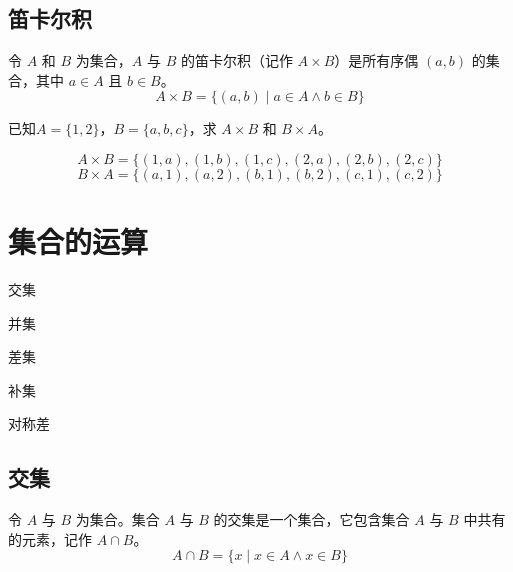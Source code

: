 \documentclass[lang=cn, chinesefont=founder, math=cm, color=cyan, citestyle=gb7714-2015, bibstyle=gb7714-2015]{elegantbook}
\begin{document}
\subsection{笛卡尔积}
\begin{definition}[笛卡尔积]\label{def:笛卡尔积}
    令 $A$ 和 $B$ 为集合，$A$ 与 $B$ 的笛卡尔积（记作 $A \times B$）是所有序偶 $(a,b)$ 的集合，其中 $a \in A$ 且 $b \in B$。
    \begin{equation*}
        A \times B = \{(a,b) \mid a \in A \land b \in B \}
    \end{equation*}
\end{definition}

\begin{collections}
    \begin{example}
        已知$A = \{1, 2\}$，$B = \{a, b, c\}$，求 $A \times B$ 和 $B \times A$。
    \end{example}
    \begin{solution}
        $$A \times B = \{(1, a), (1, b), (1, c), (2, a), (2, b), (2, c)\}$$
        $$B \times A = \{(a, 1), (a, 2), (b, 1), (b, 2), (c, 1), (c, 2)\}$$
    \end{solution}
\end{collections}

\section{集合的运算}
\begin{introduction}
    \item 交集
    \item 并集
    \item 差集
    \item 补集
    \item 对称差
\end{introduction}

\subsection{交集}
\begin{definition}[集合的交集]\label{def:交集}
    令 $A$ 与 $B$ 为集合。集合 $A$ 与 $B$ 的交集是一个集合，它包含集合 $A$ 与 $B$ 中共有的元素，记作 $A \cap B$。
    \begin{equation*}
        A \cap B = \{x \mid x \in A \land x \in B \}
    \end{equation*}
\end{definition}
\end{document}

